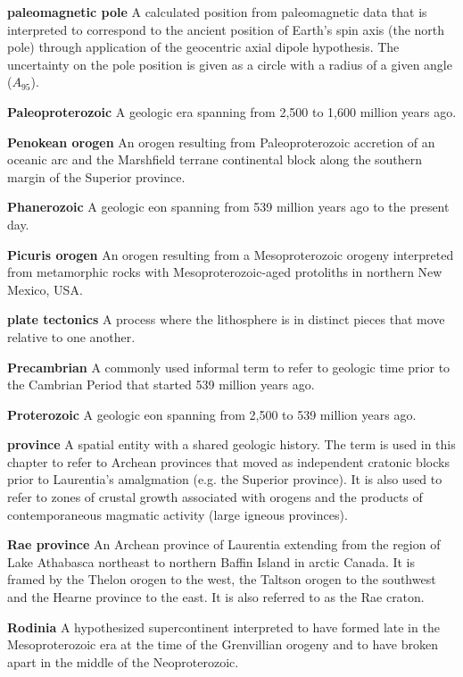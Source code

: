 \documentclass[twocolumn, switch]{article} %
\begin{document}
\noindent\textbf{paleomagnetic pole } A calculated position from paleomagnetic data that is interpreted to correspond to the ancient position of Earth's spin axis (the north pole) through application of the geocentric axial dipole hypothesis. The uncertainty on the pole position is given as a circle with a radius of a given angle ($A_{95}$).

\noindent\textbf{Paleoproterozoic } A geologic era spanning from 2,500 to 1,600 million years ago.

\noindent\textbf{Penokean orogen } An orogen resulting from Paleoproterozoic accretion of an oceanic arc and the Marshfield terrane continental block along the southern margin of the Superior province.

\noindent\textbf{Phanerozoic } A geologic eon spanning from 539 million years ago to the present day.

\noindent\textbf{Picuris orogen } An orogen resulting from a Mesoproterozoic orogeny interpreted from metamorphic rocks with Mesoproterozoic-aged protoliths in northern New Mexico, USA.

\noindent\textbf{plate tectonics } A process where the lithosphere is in distinct pieces that move relative to one another. 

\noindent\textbf{Precambrian } A commonly used informal term to refer to geologic time prior to the Cambrian Period that started 539 million years ago.

\noindent\textbf{Proterozoic } A geologic eon spanning from 2,500 to 539 million years ago.

\noindent\textbf{province } A spatial entity with a shared geologic history. The term is used in this chapter to refer to Archean provinces that moved as independent cratonic blocks prior to Laurentia's amalgmation (e.g. the Superior province). It is also used to refer to zones of crustal growth associated with orogens and the products of contemporaneous magmatic activity (large igneous provinces).

\noindent\textbf{Rae province } An Archean province of Laurentia extending from the region of Lake Athabasca northeast to northern Baffin Island in arctic Canada. It is framed by the Thelon orogen to the west, the Taltson orogen to the southwest and the Hearne province to the east. It is also referred to as the Rae craton.

\noindent\textbf{Rodinia } A hypothesized supercontinent interpreted to have formed late in the Mesoproterozoic era at the time of the Grenvillian orogeny and to have broken apart in the middle of the Neoproterozoic.
\end{document}
